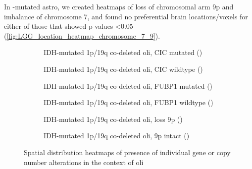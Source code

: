 In -mutated \gls{astro}, we created heatmaps of loss of chromosomal arm 9p and imbalance of chromosome 7, and found no preferential brain locations/voxels for either of those that showed p-values \num{<0.05} (\cref{fig:LGG_location_heatmap_chromosome_7_9}).

\begin{figure}[htbp]
    \centering
    \begin{subfigure}[b]{\textwidth}
        \caption{\acrshort{IDH}-mutated 1p/19q co-deleted \gls{oli}, CIC mutated ()}\label{fig:LGG_location_heatmap_oli_cic_mutated}
    \end{subfigure}
    \begin{subfigure}[b]{\textwidth}
        \caption{\acrshort{IDH}-mutated 1p/19q co-deleted \gls{oli}, CIC wildtype ()}\label{fig:LGG_location_heatmap_oli_cic_wt}
    \end{subfigure}
    \begin{subfigure}[b]{\textwidth}
        \caption{\acrshort{IDH}-mutated 1p/19q co-deleted \gls{oli}, FUBP1 mutated ()}\label{fig:LGG_location_heatmap_oli_fubp_mutated}
    \end{subfigure}
    \begin{subfigure}[b]{\textwidth}
        \caption{\acrshort{IDH}-mutated 1p/19q co-deleted \gls{oli}, FUBP1 wildtype ()}\label{fig:LGG_location_heatmap_oli_fubp_wt}
    \end{subfigure}
    \begin{subfigure}[b]{\textwidth}
        \caption{\acrshort{IDH}-mutated 1p/19q co-deleted \gls{oli}, loss 9p ()}\label{fig:LGG_location_heatmap_oli_9p_loss}
    \end{subfigure}
    \begin{subfigure}[b]{\textwidth}
        \caption{\acrshort{IDH}-mutated 1p/19q co-deleted \gls{oli}, 9p intact ()}\label{fig:LGG_location_heatmap_oli_9p_intact}
    \end{subfigure}
    \caption{Spatial distribution heatmaps of presence of individual gene or copy number alterations in the context of \gls{oli}}\label{fig:LGG_location_heatmap_multi_genetics}
\end{figure}

